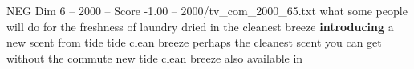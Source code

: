 \begin{textsample}{NEG Dim 6 – 2000 – Score -1.00 – 2000/tv\_com\_2000\_65.txt}  \label{ex:f6_neg_019}
what some people will do for the freshness of laundry dried in the cleanest breeze \textbf{introducing} a new scent from tide tide clean breeze perhaps the cleanest scent you can get without the commute new tide clean breeze also available in

\end{textsample}
